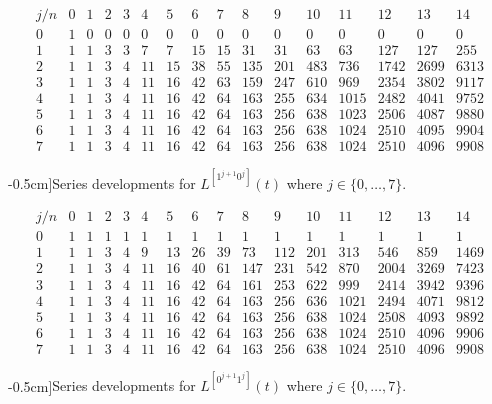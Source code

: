 
\begin{table}
\begin{equation*}\begin{array}{c|ccccccccccccccc}j/n & 0 & 1 & 2 & 3 & 4 & 5 & 6 & 7 & 8 & 9 & 10 & 11 & 12 & 13 & 14\\\hline0 & 1 & 0 & 0 & 0 & 0 & 0 & 0 & 0 & 0 & 0 & 0 & 0 & 0 & 0 & 0\\1 & 1 & 1 & 3 & 3 & 7 & 7 & 15 & 15 & 31 & 31 & 63 & 63 & 127 & 127 & 255\\2 & 1 & 1 & 3 & 4 & 11 & 15 & 38 & 55 & 135 & 201 & 483 & 736 & 1742 & 2699 & 6313\\3 & 1 & 1 & 3 & 4 & 11 & 16 & 42 & 63 & 159 & 247 & 610 & 969 & 2354 & 3802 & 9117\\4 & 1 & 1 & 3 & 4 & 11 & 16 & 42 & 64 & 163 & 255 & 634 & 1015 & 2482 & 4041 & 9752\\5 & 1 & 1 & 3 & 4 & 11 & 16 & 42 & 64 & 163 & 256 & 638 & 1023 & 2506 & 4087 & 9880\\6 & 1 & 1 & 3 & 4 & 11 & 16 & 42 & 64 & 163 & 256 & 638 & 1024 & 2510 & 4095 & 9904\\7 & 1 & 1 & 3 & 4 & 11 & 16 & 42 & 64 & 163 & 256 & 638 & 1024 & 2510 & 4096 & 9908\end{array}\end{equation*}
\caption[][-0.5cm]{Series developments for $L^{[1^{j+1}0^j]}(t)$ where $j\in \lbrace 0,\ldots,7 \rbrace$.}
\label{tbl:L1_j1:0_j}
\end{table}

\begin{table}
\begin{equation*}\begin{array}{c|ccccccccccccccc}j/n & 0 & 1 & 2 & 3 & 4 & 5 & 6 & 7 & 8 & 9 & 10 & 11 & 12 & 13 & 14\\\hline0 & 1 & 1 & 1 & 1 & 1 & 1 & 1 & 1 & 1 & 1 & 1 & 1 & 1 & 1 & 1\\1 & 1 & 1 & 3 & 4 & 9 & 13 & 26 & 39 & 73 & 112 & 201 & 313 & 546 & 859 & 1469\\2 & 1 & 1 & 3 & 4 & 11 & 16 & 40 & 61 & 147 & 231 & 542 & 870 & 2004 & 3269 & 7423\\3 & 1 & 1 & 3 & 4 & 11 & 16 & 42 & 64 & 161 & 253 & 622 & 999 & 2414 & 3942 & 9396\\4 & 1 & 1 & 3 & 4 & 11 & 16 & 42 & 64 & 163 & 256 & 636 & 1021 & 2494 & 4071 & 9812\\5 & 1 & 1 & 3 & 4 & 11 & 16 & 42 & 64 & 163 & 256 & 638 & 1024 & 2508 & 4093 & 9892\\6 & 1 & 1 & 3 & 4 & 11 & 16 & 42 & 64 & 163 & 256 & 638 & 1024 & 2510 & 4096 & 9906\\7 & 1 & 1 & 3 & 4 & 11 & 16 & 42 & 64 & 163 & 256 & 638 & 1024 & 2510 & 4096 & 9908\end{array}\end{equation*}
\caption[][-0.5cm]{Series developments for $L^{[0^{j+1}1^j]}(t)$ where $j\in \lbrace 0,\ldots,7 \rbrace$.}
\label{tbl:L0_j1:1_j}
\end{table}

